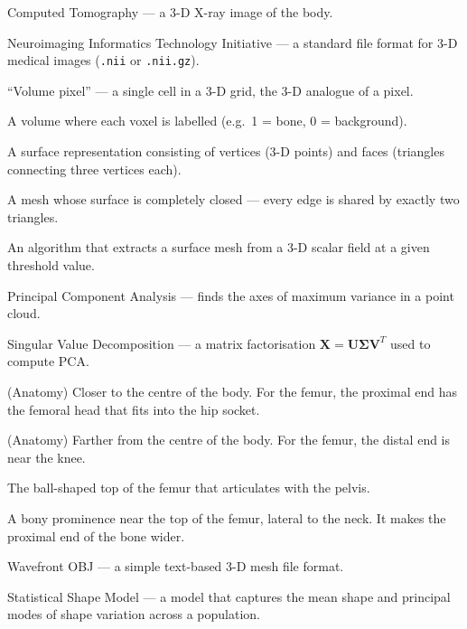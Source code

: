 \documentclass[12pt,a4paper]{article}
\begin{document}
\begin{description}[leftmargin=3cm,style=nextline]
        \item[CT scan]
                Computed Tomography — a 3-D X-ray image of the body.

    \item[NIfTI]
        Neuroimaging Informatics Technology Initiative — a standard file format
        for 3-D medical images (\texttt{.nii} or \texttt{.nii.gz}).

    \item[Voxel]
        ``Volume pixel'' — a single cell in a 3-D grid, the 3-D analogue of a
        pixel.

    \item[Segmentation mask]
        A volume where each voxel is labelled (e.g.\ 1 = bone, 0 = background).

    \item[Triangle mesh]
        A surface representation consisting of vertices (3-D points) and faces
        (triangles connecting three vertices each).

    \item[Watertight]
        A mesh whose surface is completely closed — every edge is shared by
        exactly two triangles.

    \item[Marching Cubes]
        An algorithm that extracts a surface mesh from a 3-D scalar field at a
        given threshold value.

    \item[PCA]
        Principal Component Analysis — finds the axes of maximum variance in a
        point cloud.

    \item[SVD]
        Singular Value Decomposition — a matrix factorisation
        $\mathbf{X} = \mathbf{U}\boldsymbol{\Sigma}\mathbf{V}^T$ used to
        compute PCA.

    \item[Proximal]
        (Anatomy) Closer to the centre of the body.  For the femur, the
        proximal end has the femoral head that fits into the hip socket.

    \item[Distal]
        (Anatomy) Farther from the centre of the body.  For the femur, the
        distal end is near the knee.

    \item[Femoral head]
        The ball-shaped top of the femur that articulates with the pelvis.

    \item[Greater trochanter]
        A bony prominence near the top of the femur, lateral to the neck.
        It makes the proximal end of the bone wider.

    \item[OBJ]
        Wavefront OBJ — a simple text-based 3-D mesh file format.

    \item[SSM]
        Statistical Shape Model — a model that captures the mean shape and
        principal modes of shape variation across a population.
\end{description}
\end{document}
